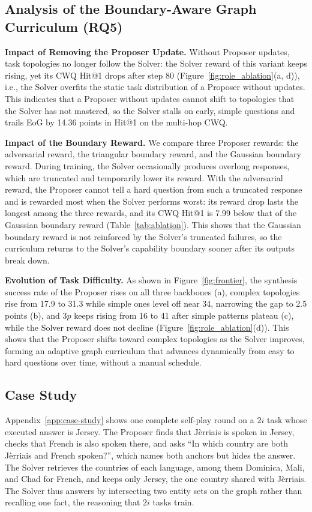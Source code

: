 \subsection{Analysis of the Boundary-Aware Graph Curriculum (RQ5)}
\label{sec:rq-frontier}

\textbf{Impact of Removing the Proposer Update.} Without Proposer updates, task topologies no longer follow the Solver: the Solver reward of this variant keeps rising, yet its CWQ Hit@1 drops after step 80 (Figure~\ref{fig:role_ablation}(a, d)), i.e., the Solver overfits the static task distribution of a Proposer without updates. This indicates that a Proposer without updates cannot shift to topologies that the Solver has not mastered, so the Solver stalls on early, simple questions and trails EoG by 14.36 points in Hit@1 on the multi-hop CWQ.

\textbf{Impact of the Boundary Reward.} We compare three Proposer rewards: the adversarial reward, the triangular boundary reward, and the Gaussian boundary reward. During training, the Solver occasionally produces overlong responses, which are truncated and temporarily lower its reward. With the adversarial reward, the Proposer cannot tell a hard question from such a truncated response and is rewarded most when the Solver performs worst: its reward drop lasts the longest among the three rewards, and its CWQ Hit@1 is 7.99 below that of the Gaussian boundary reward (Table~\ref{tab:ablation}). This shows that the Gaussian boundary reward is not reinforced by the Solver's truncated failures, so the curriculum returns to the Solver's capability boundary sooner after its outputs break down.

\textbf{Evolution of Task Difficulty.} As shown in Figure~\ref{fig:frontier}, the synthesis success rate of the Proposer rises on all three backbones (a), complex topologies rise from 17.9 to 31.3 while simple ones level off near 34, narrowing the gap to 2.5 points (b), and $3p$ keeps rising from 16 to 41 after simple patterns plateau (c), while the Solver reward does not decline (Figure~\ref{fig:role_ablation}(d)). This shows that the Proposer shifts toward complex topologies as the Solver improves, forming an adaptive graph curriculum that advances dynamically from easy to hard questions over time, without a manual schedule.

\subsection{Case Study}
\label{sec:case-study}
Appendix~\ref{app:case-study} shows one complete self-play round on a $2i$ task whose executed answer is Jersey. The Proposer finds that Jèrriais is spoken in Jersey, checks that French is also spoken there, and asks ``In which country are both Jèrriais and French spoken?'', which names both anchors but hides the answer. The Solver retrieves the countries of each language, among them Dominica, Mali, and Chad for French, and keeps only Jersey, the one country shared with Jèrriais. The Solver thus answers by intersecting two entity sets on the graph rather than recalling one fact, the reasoning that $2i$ tasks train.
